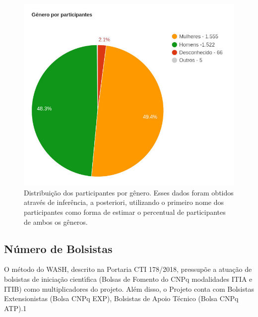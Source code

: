 \documentclass[
12pt,		%
openright,	%
twoside,  %
a4paper,			%
chapter=TITLE,		%
english,			%
french,				%
spanish,			%
brazil				%
]{USPSC-classe/USPSC}
\begin{document}
\captionsetup{format=plain}
\begin{figure}[max size={\textwidth}{\textheight}]

\centering


\begin{minipage}[b]{0.4\linewidth}
        \centering
                \includegraphics[width=1.0\linewidth]{../../imagens/genero-todos-crop.jpeg}
                \caption{Distribui\c{c}\~ao dos participantes por g\^enero. Esses dados foram obtidos atrav\'es de infer\^encia, a posteriori, utilizando o primeiro nome dos participantes como forma de estimar o percentual de participantes de ambos os g\^eneros.}
                \label{ef11d820efb73d78fb64eb6bdd03853471a8e89f}
\end{minipage}%
\hspace{0.5cm}
\end{figure}



\subsection[N\'umero de Bolsistas]{N\'umero de Bolsistas}\label{N\'umero de Bolsistas}
O m\'etodo do WASH, descrito na Portaria CTI 178/2018, pressup\~oe a atua\c{c}\~ao de bolsistas de inicia\c{c}\~ao cient\'{\i}fica (Bolsas de Fomento do CNPq modalidades ITIA e ITIB) como multiplicadores do projeto. Al\'em disso, o Projeto conta com Bolsistas Extensionistas (Bolsa CNPq EXP), Bolsistas de Apoio T\'ecnico (Bolsa CNPq ATP).1
\end{document}
